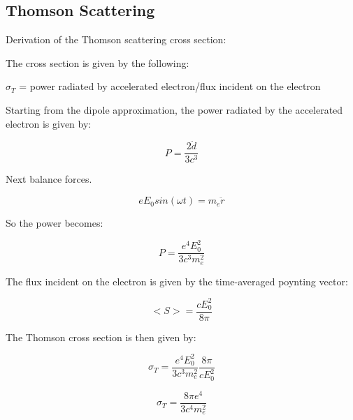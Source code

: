\subsection{Thomson Scattering}

Derivation of the Thomson scattering cross section:

The cross section is given by the following:

$\sigma_T$ = power radiated by accelerated electron/flux incident on the electron

Starting from the dipole approximation, the power radiated by the accelerated electron is given by:

\begin{equation}
P = \frac{2\ddot d}{3c^3}
\end{equation}

Next balance forces. 

\begin{equation}
eE_0sin(\omega t) = m_e\ddot r
\end{equation}

So the power becomes:

\begin{equation}
P = \frac{e^4E_0^2}{3c^3m_e^2}
\end{equation}

The flux incident on the electron is given by the time-averaged poynting vector:

\begin{equation}
<S> = \frac{cE_0^2}{8\pi}
\end{equation}

The Thomson cross section is then given by:

\begin{equation}
\sigma_T = \frac{e^4E_0^2}{3c^3m_e^2}\frac{8\pi}{cE_0^2}
\end{equation}

\begin{equation}
\sigma_T = \frac{8\pi e^4}{3c^4m_e^2}
\end{equation}



